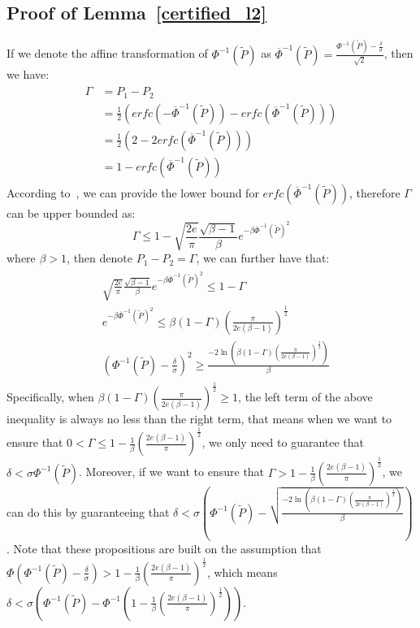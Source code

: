 \subsection{Proof of Lemma~\ref{certified_l2}}
If we denote the affine transformation of $\Phi^{-1}(\tilde{P})$ as $\overline{\Phi}^{-1}(\tilde{P})=\frac{\Phi^{-1}(\tilde{P})-\frac{\delta}{\sigma}}{\sqrt{2}}$, then we have:
\begin{align}
\begin{split}
\Gamma &= P_1 - P_2 \\
&= \frac{1}{2}(\textit{erfc} (-\overline{\Phi}^{-1}(\tilde{P}))-\textit{erfc}(\overline{\Phi}^{-1}(\tilde{P})))\\
&=\frac{1}{2}(2 - 2 \textit{erfc}(\overline{\Phi}^{-1}(\tilde{P})))\\
&=1 - \textit{erfc}(\overline{\Phi}^{-1}(\tilde{P}))
\end{split}
\end{align}
According to~\cite{chang2011chernoff}, we can provide the lower bound for $\textit{erfc}(\overline{\Phi}^{-1}(\tilde{P}))$, therefore $\Gamma$ can be upper bounded as:
\begin{equation}
\Gamma \leq 1 - \sqrt{\frac{2e}{\pi}}\frac{\sqrt{\beta-1}}{\beta}e^{-\beta\overline{\Phi}^{-1}(\tilde{P})^2}
\end{equation}
where $\beta>1$, then denote $P_1 - P_2 = \Gamma$, we can further have that:
\begin{align}
\begin{split}
&\sqrt{\frac{2e}{\pi}}\frac{\sqrt{\beta-1}}{\beta}e^{-\beta\overline{\Phi}^{-1}(\tilde{P})^2}\leq1-\Gamma\\
&e^{-\beta\overline{\Phi}^{-1}(\tilde{P})^2}\leq\beta(1-\Gamma)(\frac{\pi}{2e(\beta-1)})^{\frac{1}{2}}\\
&(\Phi^{-1}(\tilde{P})-\frac{\delta}{\sigma})^2\geq\frac{-2\ln(\beta(1-\Gamma)(\frac{\pi}{2e(\beta-1)})^{\frac{1}{2}})}{\beta}
\end{split}
\end{align}
Specifically, when $\beta(1-\Gamma)(\frac{\pi}{2e(\beta-1)})^{\frac{1}{2}}\geq1$, the left term of the above inequality is always no less than the right term, that means when we want to ensure that $0<\Gamma\leq1-\frac{1}{\beta}(\frac{2e(\beta-1)}{\pi})^{\frac{1}{2}}$, we only need to guarantee that $\delta<\sigma\Phi^{-1}(\tilde{P})$. Moreover, if we want to ensure that $\Gamma>1-\frac{1}{\beta}(\frac{2e(\beta-1)}{\pi})^{\frac{1}{2}}$, we can do this by guaranteeing that $\delta<\sigma(\Phi^{-1}(\tilde{P})-\sqrt{\frac{-2\ln(\beta(1-\Gamma)(\frac{\pi}{2e(\beta-1)})^{\frac{1}{2}})}{\beta}})$. Note that these propositions are built on the assumption that $\Phi(\Phi^{-1}(\tilde{P})-\frac{\delta}{\sigma})>1-\frac{1}{\beta}(\frac{2e(\beta-1)}{\pi})^{\frac{1}{2}}$, which means $\delta < \sigma(\Phi^{-1}(\tilde{P})-\Phi^{-1}(1-\frac{1}{\beta}(\frac{2e(\beta-1)}{\pi})^{\frac{1}{2}}))$.

